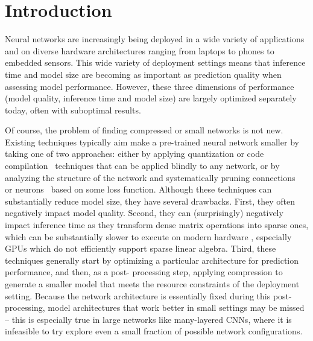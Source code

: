 
\section{Introduction}

Neural networks are increasingly being deployed in a wide variety  of
applications  and on diverse hardware architectures ranging from laptops to
phones to embedded sensors. This wide variety of deployment settings means
that inference time and model size are becoming as important as  prediction
quality when assessing model performance.  However, these three dimensions of
performance (model quality, inference time and model size)  are largely
optimized separately today, often with suboptimal results.

Of course, the problem of finding compressed or small networks is not new.
Existing techniques typically aim make a pre-trained neural network smaller
\cite{something1,something2} by taking one of two approaches:  either by
applying quantization \cite{quant} or code compilation~\cite{something}
techniques that can be applied blindly to any network, or by analyzing the
structure of the network and systematically pruning
connections~\cite{han2015deepcompression,Cun} or neurons~\cite{XXX}
based on some loss function.  Although these techniques can substantially
reduce model size, they have several drawbacks.  First, they often negatively
impact model quality.  Second, they can (surprisingly) negatively impact
inference time as they transform dense matrix operations into sparse ones,
which can be substantially slower to execute on modern hardware
\cite{something}, especially GPUs which do not efficiently support sparse
linear algebra.  Third, these techniques generally start by optimizing a
particular architecture for prediction performance, and then, as a post-
processing step, applying compression  to generate a smaller model that meets the
resource constraints of the deployment setting.  Because the network
architecture is essentially fixed during this post-processing,   model architectures
that work better in small settings may be missed -- this is especially true in
large networks like many-layered CNNs,  where it is infeasible to try explore
even a small fraction of possible network configurations.


